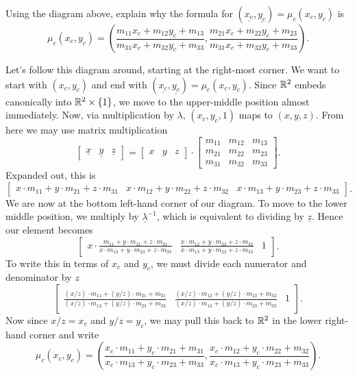 \documentclass[newpage,hints,handout]{ximera}
\begin{document}
\begin{problem}
  Using the diagram above, explain why the formula for
  $(\underline{x_{c}},\underline{y_{c}})=\mu_{c}(x_{c},y_{c})$ is
  $$\mu_c(x_c,y_c)=\left(
    \frac{m_{11}x_c+m_{12}y_c+m_{13}}{m_{31}x_c+m_{32}y_c+m_{33}},
    \frac{m_{21}x_c+m_{22}y_c+m_{23}}{m_{31}x_c+m_{32}y_c+m_{33}}
    \right).$$
  \begin{freeResponse}
    Let's follow this diagram around, starting at the right-most
    corner. We want to start with $(x_c,y_c)$ and end with
    $(\underline{x_c},\underline{y_c}) = \mu_c(x_c,y_c)$. Since $\mathbb R^2$
    embeds canonically into $\mathbb R^2\times\{1\}$, we move to the
    upper-middle position almost immediately. Now, via multiplication
    by $\lambda$, $(x_c,y_c,1)$ maps to $(x,y,z)$. From here we may use
    matrix multiplication
    \[
    \begin{bmatrix}
      \underline{x} & \underline{y} & \underline{z}
    \end{bmatrix}
    =
    \begin{bmatrix}
    x & y & z
    \end{bmatrix}
    \cdot\begin{bmatrix}
    m_{11} & m_{12} & m_{13}\\
    m_{21} & m_{22} & m_{23}\\
    m_{31} & m_{32} & m_{33}
    \end{bmatrix}.
    \]
    Expanded out, this is
    \[
    \begin{bmatrix}
      x\cdot m_{11}+y\cdot m_{21}+z\cdot m_{31} & x\cdot m_{12}+y\cdot m_{22}+z\cdot m_{32} & 
      x\cdot m_{13}+y\cdot m_{23}+z\cdot m_{33}
    \end{bmatrix}.
    \]
    We are now at the bottom left-hand corner of our diagram. To move
    to the lower middle position, we multiply by $\underline{\lambda}^{-1}$, which
    is equivalent to dividing by $\underline{z}$. Hence our element
    becomes
     \[
    \begin{bmatrix}
      x\cdot \frac{m_{11}+y\cdot m_{21}+z\cdot m_{31}}{x\cdot m_{13}+y\cdot m_{23}+z\cdot m_{33}} &
      \frac{x\cdot m_{12}+y\cdot m_{22}+z\cdot m_{32}}{x\cdot m_{13}+y\cdot m_{23}+z\cdot m_{33}} & 1
    \end{bmatrix}.
    \]
    To write this in terms of $x_c$ and $y_c$, we must divide each
    numerator and denominator by $z$
    \[
    \begin{bmatrix}
      \frac{(x/z)\cdot m_{11}+(y/z)\cdot m_{21}+m_{31}}{(x/z)\cdot m_{13}+(y/z)\cdot m_{23}+m_{33}}
      &
      \frac{(x/z)\cdot m_{12}+(y/z)\cdot m_{22}+m_{32}}{(x/z)\cdot m_{13}+(y/z)\cdot m_{23}+m_{33}}
      & 1
    \end{bmatrix}.
    \]
    Now since $x/z = x_c$ and $y/z =y_c$, we may pull this back to
    $\mathbb R^2$ in the lower right-hand corner and write
    \[
    \mu_c(x_c,y_c) = \left(
    \frac{x_c\cdot m_{11} + y_c\cdot m_{21} + m_{31}}{x_c\cdot m_{13} + y_c\cdot m_{23} + m_{33}},
    \frac{x_c\cdot m_{12} + y_c\cdot m_{22} + m_{32}}{x_c\cdot m_{13} + y_c\cdot m_{23} + m_{33}}
    \right).
    \]
  \end{freeResponse}
\end{problem}
\end{document}
